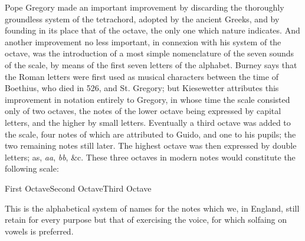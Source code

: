 Pope Gregory made an important improvement by discarding the thoroughly
groundless system of the tetrachord, adopted by the ancient Greeks, and by
founding in its place that of the octave, the only one which nature indicates. And
another improvement no less important, in connexion with his system of the
octave, was the introduction of a most simple nomenclature of the seven sounds of
the scale, by means of the first seven letters of the alphabet. Burney says that the
Roman letters were first used as musical characters between the time of Boethius,
who died in 526, and St. Gregory; but Kiesewetter attributes this improvement
in notation entirely to Gregory, in whose time the scale consisted only of two 
octaves, the notes of the lower octave \pagebreak being expressed by capital letters, and the
higher by small letters. Eventually a third octave was added to the scale, four 
notes of which are attributed to Guido, and one to his pupils; the two remaining 
notes still later. The highest octave was then expressed by double letters; as, \textit{aa},
\textit{bb}, \&c. These three octaves in modern notes would constitute the following scale:

\noindent\begin{minipage}{\textwidth}

\vspace{-\baselineskip}
{\small\noindent\hspace*{4em} First Octave\hfill Second Octave\hfill Third Octave\hspace*{4em}}
\bigskip
\end{minipage}

This is the alphabetical system of names for the notes which we, in England,
still retain for every purpose but that of exercising the voice, for which solfaing
on vowels is preferred.

